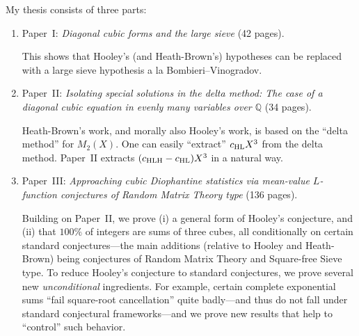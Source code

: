 \documentclass[12pt]{article}
\begin{document}
My thesis consists of three parts:
\begin{enumerate}
    \item Paper~I:
    \emph{Diagonal cubic forms and the large sieve}
    (42 pages).
    
    This shows that Hooley's (and Heath-Brown's) hypotheses can be replaced with
    a large sieve hypothesis a la Bombieri--Vinogradov.
    
    \item Paper~II:
    \emph{Isolating special solutions in the delta method:
    The case of a diagonal cubic equation in evenly many variables over $\mathbb{Q}$}
    (34 pages).
    
    Heath-Brown's work, and morally also Hooley's work, is based on the ``delta method'' for $M_2(X)$.
    One can easily ``extract'' $c_{\textnormal{HL}}X^3$ from the delta method.
    Paper~II extracts $(c_{\textnormal{HLH}}-c_{\textnormal{HL}})X^3$ in a natural way.
    
    \item Paper~III:
    \emph{Approaching cubic Diophantine statistics via mean-value $L$-function conjectures of Random Matrix Theory type}
    (136 pages).
    
    Building on Paper~II,
    we prove (i) a general form of Hooley's conjecture,
    and (ii) that $100\%$ of integers are sums of three cubes,
    all conditionally on certain standard conjectures---the main additions (relative to Hooley and Heath-Brown) being conjectures of Random Matrix Theory and Square-free Sieve type.
    To reduce Hooley's conjecture to standard conjectures,
    we prove several new \emph{unconditional} ingredients.
    For example, certain complete exponential sums ``fail square-root cancellation'' quite badly---and thus do not fall under standard conjectural frameworks---and we prove new results that help to ``control'' such behavior.
\end{enumerate}


\end{document}
